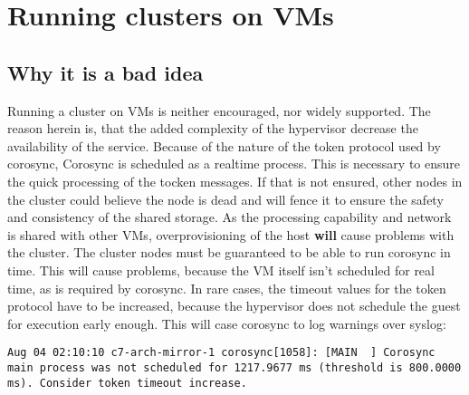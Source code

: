 


\section{Running clusters on \acp{VM}}
\subsection{Why it is a bad idea}
Running a cluster on \acp{VM} is neither encouraged, nor widely supported.
The reason herein is, that the added complexity of the hypervisor decrease the availability
of the service. Because of the nature of the token protocol used by corosync,
Corosync is scheduled as a realtime process. This is necessary to ensure the quick
processing of the tocken messages. If that is not ensured, other nodes
in the cluster could believe the node is dead and will fence it to ensure the safety
and consistency of the shared storage.
As the processing capability and network is shared with other \acp{VM},
overprovisioning of the host \textbf{will} cause problems with the cluster.
The cluster nodes must be guaranteed to be able to run corosync in time.
This will cause problems, because the \ac{VM} itself isn't scheduled for real time,
as is required by corosync.
In rare cases, the timeout values for the token protocol have to be increased,
because the hypervisor does not schedule the guest for execution early enough.
This will case corosync to log warnings over syslog:
\begin{lstlisting}
Aug 04 02:10:10 c7-arch-mirror-1 corosync[1058]: [MAIN  ] Corosync main process was not scheduled for 1217.9677 ms (threshold is 800.0000 ms). Consider token timeout increase.
\end{lstlisting}
